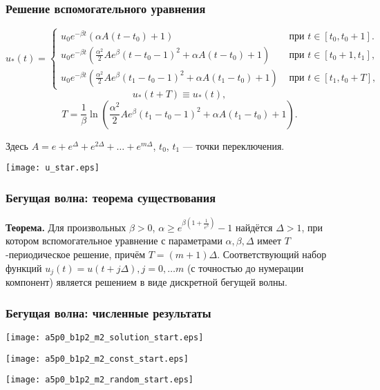 \begin{frame}
	\frametitle{Решение вспомогательного уравнения}
	\small
	\begin{equation*}
		\label{eq:u_star}
		u_*(t)=
		\begin{cases}
			u_0 e^{-\beta t}(\alpha A(t-t_0)+1) & \text{ при } t\in[t_0,t_0+1].
			\\
			u_0 e^{-\beta t}\left(\frac{\alpha^2}{2}Ae^{\beta}(t-t_0-1)^2+\alpha A(t-t_0)+1\right) & \text{ при } t\in[t_0+1,t_1],
			\\
			u_0 e^{-\beta t}\left(\frac{\alpha^2}{2}Ae^{\beta}(t_1-t_0-1)^2+\alpha A(t_1-t_0)+1\right) & \text{ при } t\in[t_1,t_0+T],
		\end{cases}
	\end{equation*}
	\normalsize
	\[
	u_*(t+T)\equiv u_*(t),
	\]
	\begin{equation*}
		\label{eq:mg_period_T}
		T = \dfrac{1}{\beta}\ln\left( \frac{\alpha^2}{2}Ae^{\beta}(t_1-t_0-1)^2+\alpha A(t_1-t_0)+1\right). 
	\end{equation*}
	
	Здесь $A = e + e^{\Delta} + e^{2\Delta} + \ldots + e^{m\Delta}$, $t_0$, $t_1$ --- точки переключения.
	
	\begin{center}
		\texttt{[image: u\_star.eps]}
	
	\end{center}
\end{frame}

\begin{frame}
	\frametitle{Бегущая волна: теорема существования}
	
	\textbf{Теорема.} 
	Для произвольных $\beta > 0$, $\alpha \geqslant e^{\beta\left(1 + \frac{1}{e^{\beta}}\right)} - 1$ найдётся $\Delta > 1$, при котором вспомогательное уравнение с параметрами $\alpha, \beta, \Delta$ имеет $T$-периодическое решение, причём $T = (m + 1) \Delta$. Соответствующий набор функций $u_j(t) = u(t + j \Delta), j = 0, \ldots m$ (с точностью до нумерации компонент) является решением в виде дискретной бегущей волны.
\end{frame}

\begin{frame}
	\frametitle{Бегущая волна: численные результаты}
	
	\begin{center}
		\texttt{[image: a5p0\_b1p2\_m2\_solution\_start.eps]}
		
		\texttt{[image: a5p0\_b1p2\_m2\_const\_start.eps]}
		
		\texttt{[image: a5p0\_b1p2\_m2\_random\_start.eps]}
	\end{center}
\end{frame}

